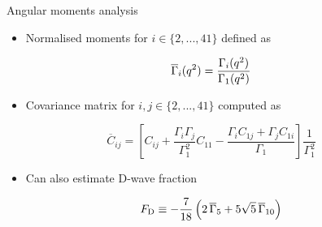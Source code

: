 \documentclass[aspectratio=1610]{beamer}
\begin{document}
\begin{frame}{Angular moments analysis}

\begin{itemize}
\item Normalised moments for $i \in \{2,...,41\}$ defined as
\end{itemize}
\begin{equation*}
\overline{\Gamma}_i({q^2}) = \frac{\Gamma_{i}({q^2})}{\Gamma_{1}({q^2})}
\end{equation*}
\begin{itemize}
\item Covariance matrix for $i,j \in \{2,...,41\}$ computed as
\end{itemize}

\begin{equation*}
\overline{C}_{ij} = \left[C_{ij} + \frac{\Gamma_i \Gamma_j}{\Gamma_1^2} C_{11} - \frac{\Gamma_i C_{1j} + \Gamma_j C_{1i}}{\Gamma_1}\right] \frac{1}{\Gamma_1^2}
\end{equation*}

\begin{itemize}
\item[\ding{80}] Can also estimate D-wave fraction
\end{itemize}

\begin{equation*}
F_{\rm D} \equiv  \displaystyle - \frac{7}{18} \left(2\,\overline{\Gamma}_{5} + 5 \sqrt{5}\,\overline{\Gamma}_{10} \right)
\end{equation*}

\end{frame}
\end{document}

